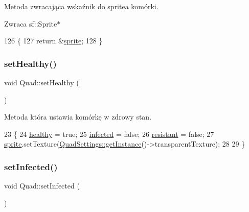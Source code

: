 Metoda zwracająca wskaźnik do sprite\textquotesingle{}a komórki. \begin{DoxyReturn}{Zwraca}
sf\+::\+Sprite$\ast$ 
\end{DoxyReturn}

\begin{DoxyCode}
126 \{
127     \textcolor{keywordflow}{return} &\mbox{\hyperlink{class_quad_a83667bb824c1d6eca6c9c8b6e6d07d06}{sprite}};
128 \}
\end{DoxyCode}
\mbox{\label{class_quad_a3b6d55ec11182c7151bb3894ab397204}} 
\subsubsection{\texorpdfstring{set\+Healthy()}{setHealthy()}}
{\footnotesize\ttfamily void Quad\+::set\+Healthy (\begin{DoxyParamCaption}{ }\end{DoxyParamCaption})\hspace{0.3cm}{\ttfamily [private]}}

Metoda która ustawia komórkę w zdrowy stan. 
\begin{DoxyCode}
23 \{
24     \mbox{\hyperlink{class_quad_a4994c09af588aeb08c482ea46494a08c}{healthy}} = \textcolor{keyword}{true};
25     \mbox{\hyperlink{class_quad_ae439ca631a9f51147b9d84a9c9df49c4}{infected}} = \textcolor{keyword}{false};
26     \mbox{\hyperlink{class_quad_ae2197ad46a2d7e409b2ca9e7ac25a80c}{resistant}} = \textcolor{keyword}{false};
27     \mbox{\hyperlink{class_quad_a83667bb824c1d6eca6c9c8b6e6d07d06}{sprite}}.setTexture(\mbox{\hyperlink{class_quad_settings_a20d7cfd0c56c11adcdf75c5e3011de67}{QuadSettings::getInstance}}()->transparentTexture);
28     
29 \}
\end{DoxyCode}
\mbox{\label{class_quad_af92ade1062347d22d3715696f5f2449c}} 
\subsubsection{\texorpdfstring{set\+Infected()}{setInfected()}}
{\footnotesize\ttfamily void Quad\+::set\+Infected (\begin{DoxyParamCaption}{ }\end{DoxyParamCaption})}

